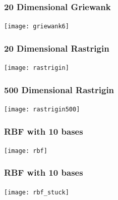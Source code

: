 \documentclass{beamer}
\begin{document}
\begin{frame}
  \frametitle{20 Dimensional Griewank}
  \begin{center}
	\texttt{[image: griewank6]}
  \end{center}
\end{frame}

\begin{frame}
  \frametitle{20 Dimensional Rastrigin}
  \begin{center}
	\texttt{[image: rastrigin]}
  \end{center}
\end{frame}

\begin{frame}
  \frametitle{500 Dimensional Rastrigin}
  \begin{center}
	\texttt{[image: rastrigin500]}
  \end{center}
\end{frame}

\begin{frame}
  \frametitle{RBF with 10 bases}
  \begin{center}
	\texttt{[image: rbf]}
  \end{center}
\end{frame}

\begin{frame}
  \frametitle{RBF with 10 bases}
  \begin{center}
	\texttt{[image: rbf\_stuck]}
  \end{center}
\end{frame}
\end{document}
